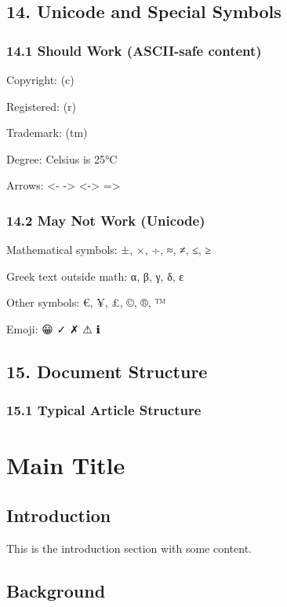\documentclass{article}
\begin{document}
\noindent\hrulefill

\subsection{ 14. Unicode and Special Symbols}

\subsubsection{ 14.1 Should Work (ASCII-safe content)}

Copyright: (c)

Registered: (r)

Trademark: (tm)

Degree: Celsius is 25°C

Arrows: <- -> <-> =>

\subsubsection{ 14.2 May Not Work (Unicode)}

Mathematical symbols: ±, ×, ÷, ≈, ≠, ≤, ≥

Greek text outside math: α, β, γ, δ, ε

Other symbols: €, ¥, £, ©, ®, ™

Emoji: 😀 ✓ ✗ ⚠ ℹ

\noindent\hrulefill

\subsection{ 15. Document Structure}

\subsubsection{ 15.1 Typical Article Structure}

\section{ Main Title}

\subsection{ Introduction}

This is the introduction section with some content.

\subsection{ Background}
\end{document}
